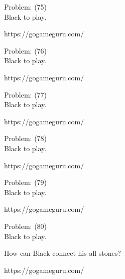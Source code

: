 \documentclass[11pt]{article}
\begin{document}
\begin{minipage}[t]{0.5\textwidth}
  {\centering
  
  Problem: (75)\\
  Black to play.

https://gogameguru.com/\\
  }
\end{minipage}
\begin{minipage}[t]{0.5\textwidth}
  {\centering
  
  Problem: (76)\\
  Black to play.

https://gogameguru.com/\\
  }
\end{minipage}
\begin{minipage}[t]{0.5\textwidth}
  {\centering
  
  Problem: (77)\\
  Black to play.

https://gogameguru.com/\\
  }
\end{minipage}
\begin{minipage}[t]{0.5\textwidth}
  {\centering
  
  Problem: (78)\\
  Black to play.

https://gogameguru.com/\\
  }
\end{minipage}
\begin{minipage}[t]{0.5\textwidth}
  {\centering
  
  Problem: (79)\\
  Black to play.

https://gogameguru.com/\\
  }
\end{minipage}
\begin{minipage}[t]{0.5\textwidth}
  {\centering
  
  Problem: (80)\\
  Black to play.

How can Black connect his all stones?

https://gogameguru.com/\\
  }
\end{minipage}
\end{document}
